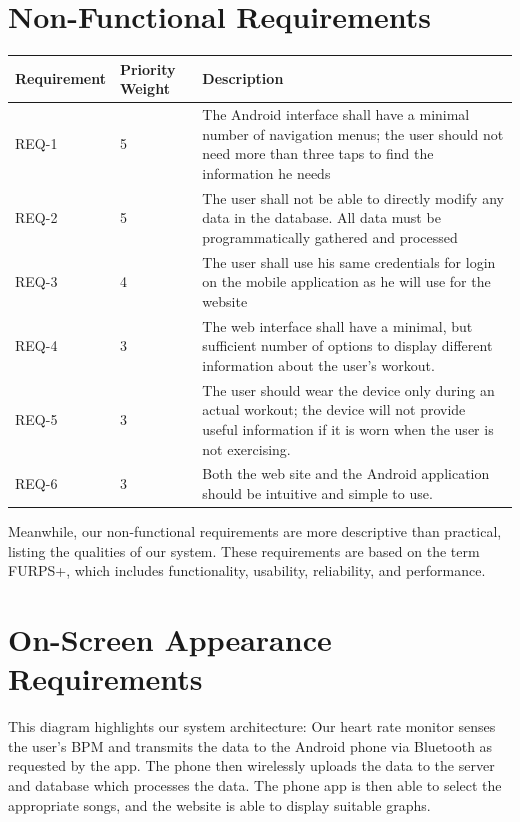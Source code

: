 \documentclass[letterpaper,english, 12pt]{scrreprt}
\begin{document}
\section{Non-Functional Requirements}
\begin{center}
	\begin{tabular}{|C{2cm}|C{2cm}|C{8cm}|}
		\hline
			Requirement & Priority Weight & Description \\
		\hline
			REQ-1 & 5 & The Android interface shall have a minimal number of navigation menus; the user should not need more than three taps to find the information he needs \\
		\hline
			REQ-2 & 5 & The user shall not be able to directly modify any data in the database. All data must be programmatically gathered and processed \\
		\hline
			REQ-3 & 4 & The user shall use his same credentials for login on the mobile application as he will use for the website \\
		\hline
			REQ-4 & 3 & The web interface shall have a minimal, but sufficient number of options to display different information about the user's workout. \\
		\hline
			REQ-5 & 3 & The user should wear the device only during an actual workout; the device will not provide useful information if it is worn when the user is not exercising. \\
		\hline	
			REQ-6 & 3 & Both the web site and the Android application should be intuitive and simple to use. \\
		\hline
	\end{tabular}
\end{center}

Meanwhile, our non-functional requirements are more descriptive than practical,
listing the qualities of our system. These requirements are based on the term
FURPS+, which includes functionality, usability, reliability, and performance.

\section{On-Screen Appearance Requirements}
This diagram highlights our system architecture: Our heart rate monitor senses the
user’s BPM and transmits the data to the Android phone via Bluetooth as requested
by the app. The phone then wirelessly uploads the data to the server and database
which processes the data. The phone app is then able to select the appropriate
songs, and the website is able to display suitable graphs.
\end{document}
